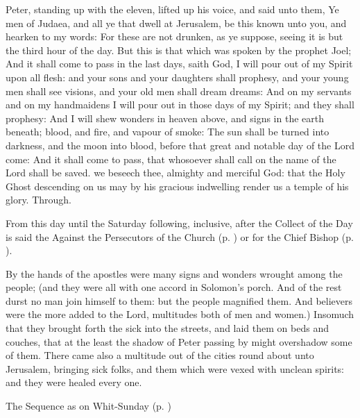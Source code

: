  Peter, standing up with the eleven, lifted up his voice, and said unto them, Ye men of Judaea, and all ye that dwell at Jerusalem, be this known unto you, and hearken to my words: For these are not drunken, as ye suppose, seeing it is but the third hour of the day. But this is that which was spoken by the prophet Joel; And it shall come to pass in the last days, saith God, I will pour out of my Spirit upon all flesh: and your sons and your daughters shall prophesy, and your young men shall see visions, and your old men shall dream dreams: And on my servants and on my handmaidens I will pour out in those days of my Spirit; and they shall prophesy: And I will shew wonders in heaven above, and signs in the earth beneath; blood, and fire, and vapour of smoke: The sun shall be turned into darkness, and the moon into blood, before that great and notable day of the Lord come: And it shall come to pass, that whosoever shall call on the name of the Lord shall be saved.
\collect
{} we beseech thee, almighty and merciful God: that the Holy Ghost descending on us may by his gracious indwelling render us a temple of his glory. Through.
\begin{rubric}
    From this day until the Saturday following, inclusive, after the Collect of the Day is said the  Against the Persecutors of the Church (p. \pageref{SPAgainst}) or for the Chief Bishop (p. \pageref{SPChiefBishop}).
\end{rubric}
 By the hands of the apostles were many signs and wonders wrought among the people; (and they were all with one accord in Solomon's porch. And of the rest durst no man join himself to them: but the people magnified them. And believers were the more added to the Lord, multitudes both of men and women.) Insomuch that they brought forth the sick into the streets, and laid them on beds and couches, that at the least the shadow of Peter passing by might overshadow some of them. There came also a multitude out of the cities round about unto Jerusalem, bringing sick folks, and them which were vexed with unclean spirits: and they were healed every one.
\begin{rubric}
{The Sequence as on Whit-Sunday (p. \pageref{WhitSeq})}
\end{rubric}
